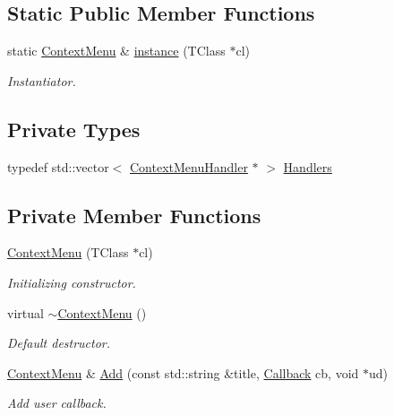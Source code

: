 \subsection*{Static Public Member Functions}
\begin{DoxyCompactItemize}
\item 
static \hyperlink{class_d_d4hep_1_1_context_menu}{ContextMenu} \& \hyperlink{class_d_d4hep_1_1_context_menu_a2078c5a59a73ba9d83e6d22f1fa52e6a}{instance} (TClass $\ast$cl)
\begin{DoxyCompactList}\small\item\em Instantiator. \item\end{DoxyCompactList}\end{DoxyCompactItemize}
\subsection*{Private Types}
\begin{DoxyCompactItemize}
\item 
typedef std::vector$<$ \hyperlink{class_d_d4hep_1_1_context_menu_handler}{ContextMenuHandler} $\ast$ $>$ \hyperlink{class_d_d4hep_1_1_context_menu_adafcfb2730659701df2a5364333ed386}{Handlers}
\end{DoxyCompactItemize}
\subsection*{Private Member Functions}
\begin{DoxyCompactItemize}
\item 
\hyperlink{class_d_d4hep_1_1_context_menu_aef60e3701d390f8a172be3de9c5a59ba}{ContextMenu} (TClass $\ast$cl)
\begin{DoxyCompactList}\small\item\em Initializing constructor. \item\end{DoxyCompactList}\item 
virtual \hyperlink{class_d_d4hep_1_1_context_menu_a0ddd00b5e23fb9d89ad3cabae38aecf9}{$\sim$ContextMenu} ()
\begin{DoxyCompactList}\small\item\em Default destructor. \item\end{DoxyCompactList}\item 
\hyperlink{class_d_d4hep_1_1_context_menu}{ContextMenu} \& \hyperlink{class_d_d4hep_1_1_context_menu_a5bfaad4484aed94a2d1298048426e5c1}{Add} (const std::string \&title, \hyperlink{class_d_d4hep_1_1_callback}{Callback} cb, void $\ast$ud)
\begin{DoxyCompactList}\small\item\em Add user callback. \item\end{DoxyCompactList}\end{DoxyCompactItemize}
